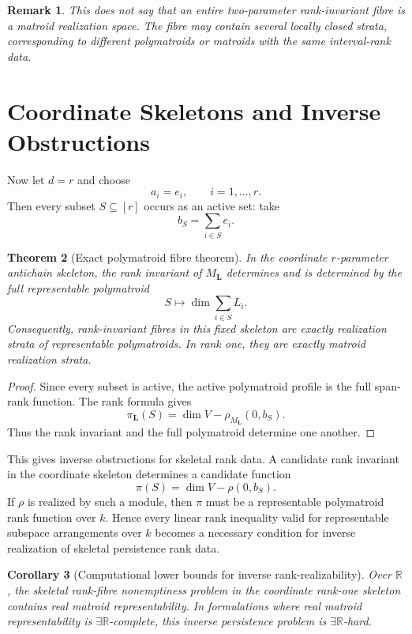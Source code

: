 \documentclass[11pt]{article}
\newtheorem{theorem}{Theorem}[section]
\newtheorem{corollary}[theorem]{Corollary}
\newtheorem{remark}[theorem]{Remark}
\begin{document}
\begin{remark}
This does not say that an entire two-parameter rank-invariant fibre is a matroid realization space. The fibre may contain several locally closed strata, corresponding to different polymatroids or matroids with the same interval-rank data.
\end{remark}

\section{Coordinate Skeletons and Inverse Obstructions}

Now let \(d=r\) and choose
\[
a_i=e_i,
\qquad
i=1,\ldots,r.
\]
Then every subset \(S\subseteq[r]\) occurs as an active set: take
\[
b_S=\sum_{i\in S}e_i.
\]

\begin{theorem}[Exact polymatroid fibre theorem]
In the coordinate \(r\)-parameter antichain skeleton, the rank invariant of \(M_{\mathbf L}\) determines and is determined by the full representable polymatroid
\[
S\longmapsto \dim\sum_{i\in S}L_i.
\]
Consequently, rank-invariant fibres in this fixed skeleton are exactly realization strata of representable polymatroids. In rank one, they are exactly matroid realization strata.
\end{theorem}

\begin{proof}
Since every subset is active, the active polymatroid profile is the full span-rank function. The rank formula gives
\[
\pi_{\mathbf L}(S)
=
\dim V-\rho_{M_{\mathbf L}}(0,b_S).
\]
Thus the rank invariant and the full polymatroid determine one another.
\end{proof}

This gives inverse obstructions for skeletal rank data. A candidate rank invariant in the coordinate skeleton determines a candidate function
\[
\pi(S)=\dim V-\rho(0,b_S).
\]
If \(\rho\) is realized by such a module, then \(\pi\) must be a representable polymatroid rank function over \(k\). Hence every linear rank inequality valid for representable subspace arrangements over \(k\) becomes a necessary condition for inverse realization of skeletal persistence rank data.

\begin{corollary}[Computational lower bounds for inverse rank-realizability]
Over \(\mathbb R\), the skeletal rank-fibre nonemptiness problem in the coordinate rank-one skeleton contains real matroid representability. In formulations where real matroid representability is \(\exists\mathbb R\)-complete, this inverse persistence problem is \(\exists\mathbb R\)-hard.
\end{corollary}
\end{document}

